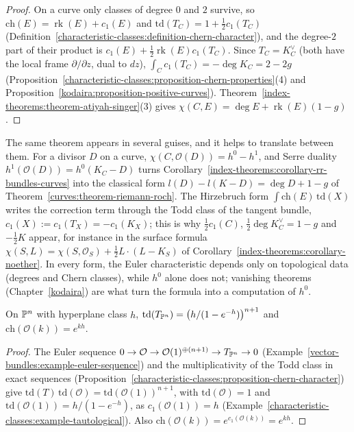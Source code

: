 \begin{proof}
On a curve only classes of degree $0$ and $2$ survive, so $\mathrm{ch}(E) = \operatorname{rk}(E) + c_1(E)$ and $\mathrm{td}(T_C) = 1 + \frac12c_1(T_C)$ (Definition~\ref{characteristic-classes:definition-chern-character}), and the degree-$2$ part of their
product is $c_1(E) + \frac12\operatorname{rk}(E)c_1(T_C)$. Since $T_C = K_C^\vee$ (both have the local frame $\partial/\partial z$, dual to $dz$), $\int_Cc_1(T_C) = -\deg K_C = 2 - 2g$
(Proposition~\ref{characteristic-classes:proposition-chern-properties}(4) and Proposition~\ref{kodaira:proposition-positive-curves}). Theorem~\ref{index-theorems:theorem-atiyah-singer}(3) gives
$\chi(C, E) = \deg E + \operatorname{rk}(E)(1 - g)$.
\end{proof}

\begin{remark}\label{index-theorems:remark-forms-of-riemann-roch}
The same theorem appears in several guises, and it helps to translate between them. For a divisor $D$ on a curve, $\chi(C, \mathcal{O}(D)) = h^0 - h^1$, and Serre duality $h^1(\mathcal{O}(D)) = h^0(K_C - D)$ turns
Corollary~\ref{index-theorems:corollary-rr-bundles-curves} into the classical form $l(D) - l(K - D) = \deg D + 1 - g$ of Theorem~\ref{curves:theorem-riemann-roch}. The Hirzebruch form $\int\mathrm{ch}(E)\,\mathrm{td}(X)$ writes the correction
term through the Todd class of the tangent bundle, $c_1(X) := c_1(T_X) = -c_1(K_X)$; this is why $\frac12c_1(C)$, $\frac12\deg K_C^\vee = 1 - g$ and $-\frac12K$ appear, for instance in the surface formula
$\chi(S, L) = \chi(S, \mathcal{O}_S) + \frac12L \cdot (L - K_S)$ of Corollary~\ref{index-theorems:corollary-noether}. In every form, the Euler characteristic depends only on topological data (degrees and Chern classes), while
$h^0$ alone does not; vanishing theorems (Chapter~\ref{kodaira}) are what turn the formula into a computation of $h^0$.
\end{remark}

\begin{lemma}\label{index-theorems:lemma-todd-projective}
On $\mathbb{P}^n$ with hyperplane class $h$, $\mathrm{td}(T_{\mathbb{P}^n}) = \big(h/(1 - e^{-h})\big)^{n+1}$ and $\mathrm{ch}(\mathcal{O}(k)) = e^{kh}$.
\end{lemma}

\begin{proof}
The Euler sequence $0 \to \mathcal{O} \to \mathcal{O}(1)^{\oplus(n+1)} \to T_{\mathbb{P}^n} \to 0$ (Example~\ref{vector-bundles:example-euler-sequence}) and the multiplicativity of the Todd class in exact sequences
(Proposition~\ref{characteristic-classes:proposition-chern-character}) give $\mathrm{td}(T)\,\mathrm{td}(\mathcal{O}) = \mathrm{td}(\mathcal{O}(1))^{n+1}$, with $\mathrm{td}(\mathcal{O}) = 1$ and $\mathrm{td}(\mathcal{O}(1)) = h/(1 - e^{-h})$,
as $c_1(\mathcal{O}(1)) = h$ (Example~\ref{characteristic-classes:example-tautological}). Also $\mathrm{ch}(\mathcal{O}(k)) = e^{c_1(\mathcal{O}(k))} = e^{kh}$.
\end{proof}

